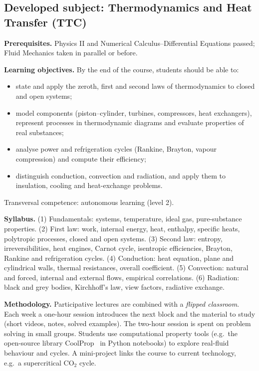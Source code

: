 \documentclass[11pt]{article}
\begin{document}
\subsection{Developed subject: Thermodynamics and Heat Transfer (TTC)}\label{sec:ttc}

\textbf{Prerequisites.} Physics II and Numerical Calculus--Differential Equations passed;
Fluid Mechanics taken in parallel or before.

\textbf{Learning objectives.} By the end of the course, students should be able to:
\begin{itemize}
\item state and apply the zeroth, first and second laws of thermodynamics to closed and open systems;
\item model components (piston--cylinder, turbines, compressors, heat exchangers), represent
processes in thermodynamic diagrams and evaluate properties of real substances;
\item analyse power and refrigeration cycles (Rankine, Brayton, vapour compression) and compute their efficiency;
\item distinguish conduction, convection and radiation, and apply them to insulation, cooling and heat-exchange problems.
\end{itemize}
Transversal competence: autonomous learning (level 2).

\textbf{Syllabus.}
(1) Fundamentals: systems, temperature, ideal gas, pure-substance properties.
(2) First law: work, internal energy, heat, enthalpy, specific heats, polytropic processes, closed and open systems.
(3) Second law: entropy, irreversibilities, heat engines, Carnot cycle, isentropic efficiencies, Brayton, Rankine and refrigeration cycles.
(4) Conduction: heat equation, plane and cylindrical walls, thermal resistances, overall coefficient.
(5) Convection: natural and forced, internal and external flows, empirical correlations.
(6) Radiation: black and grey bodies, Kirchhoff's law, view factors, radiative exchange.

\textbf{Methodology.} Participative lectures are combined with a \emph{flipped
classroom}. Each week a one-hour session introduces the next block and the material to
study (short videos, notes, solved examples). The two-hour session is spent on problem
solving in small groups. Students use computational property tools (e.g.\ the
open-source library CoolProp~\cite{CoolProp2014} in Python notebooks) to explore real-fluid behaviour and
cycles. A mini-project links the course to current technology, e.g.\ a supercritical
CO$_2$ cycle.
\end{document}
